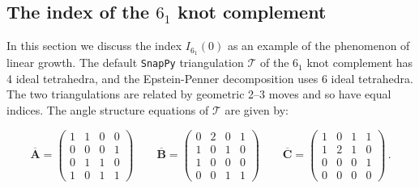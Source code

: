 \documentclass[12pt]{amsart}
\theoremstyle{definition}
\theoremstyle{remark}
\def\lbl{\label}
\newcommand{\CT}{\mathcal{T}}
\newcommand{\mb}{\mathbf}
\begin{document}
\subsection{The index of the $6_1$ knot complement}
\lbl{sub.index61}

In this section we discuss the index $I_{6_1}(0)$ as an example of the
phenomenon of linear growth. 
The default {\tt SnapPy} triangulation $\CT$ of the $6_1$ knot  complement has
4 ideal tetrahedra, and the Epstein-Penner decomposition uses 6 ideal
tetrahedra. The two triangulations are related by geometric 2--3 moves
and so have equal indices.
The angle structure equations of $\CT$ are given by:

$$
\overline{\mb A} =
\left(
\begin{array}{cccc}
 1 & 1 & 0 & 0 \\
 0 & 0 & 0 & 1 \\
 0 & 1 & 1 & 0 \\
 1 & 0 & 1 & 1 
\end{array}
\right)
\qquad
\overline{\mb B} =
\left(
\begin{array}{cccc}
 0 & 2 & 0 & 1 \\
 1 & 0 & 1 & 0 \\
 1 & 0 & 0 & 0 \\
 0 & 0 & 1 & 1
\end{array}
\right)
\qquad
\overline{\mb C} =
\left(
\begin{array}{cccc}
 1 & 0 & 1 & 1 \\
 1 & 2 & 1 & 0 \\
 0 & 0 & 0 & 1 \\
 0 & 0 & 0 & 0
\end{array}
\right) \, .
$$
\end{document}
